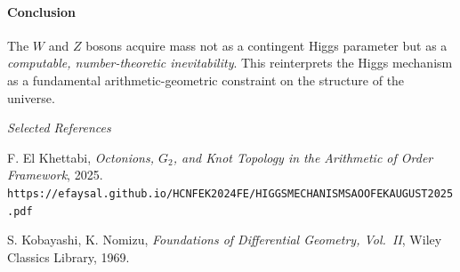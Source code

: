 \documentclass[12pt]{article}
\begin{document}
\paragraph{Conclusion}
The \(W\) and \(Z\) bosons acquire mass not as a contingent Higgs parameter but as a \emph{computable, number-theoretic inevitability}. This reinterprets the Higgs mechanism as a fundamental arithmetic-geometric constraint on the structure of the universe.

\bigskip
\hrulefill
\bigskip

\noindent\emph{Selected References}
\begin{enumerate}[label={[\arabic*]}]
    \item F. El Khettabi, \emph{Octonions, \(G_2\), and Knot Topology in the Arithmetic of Order Framework}, 2025.\\
    \texttt{https://efaysal.github.io/HCNFEK2024FE/HIGGSMECHANISMSAOOFEKAUGUST2025.pdf}
    \item S. Kobayashi, K. Nomizu, \emph{Foundations of Differential Geometry, Vol.~II}, Wiley Classics Library, 1969.
\end{enumerate}
\end{document}
